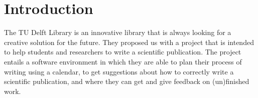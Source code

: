 \chapter{Introduction}

The TU Delft Library is an innovative library that is always looking for a creative solution for the future. They proposed us with a project that is intended to help students and researchers to write a scientific publication. The project entails a software environment in which they are able to plan their process of writing using a calendar, to get suggestions about how to correctly write a scientific publication, and where they can get and give feedback on (un)finished work.\\\\